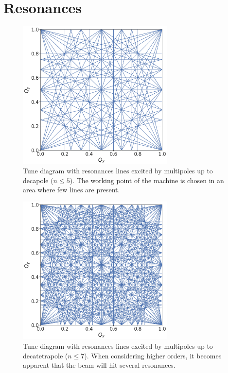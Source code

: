 \section{Resonances}


%

\begin{figure}[H]
    \centering
    \includegraphics[width=0.7\textwidth]{images/resonance_diagaram_n5.png}
    \caption{Tune diagram with resonances lines excited by multipoles up to decapole ($n \leq 5$).
             The working point of the machine is chosen in an area where few lines are present.}
    \label{fig:resonances:diagram_n5}
\end{figure}


\begin{figure}[H]
    \centering
    \includegraphics[width=0.7\textwidth]{images/resonance_diagaram_n7.png}
    \caption{Tune diagram with resonances lines excited by multipoles up to decatetrapole 
             ($n \leq 7$). When considering higher orders, it becomes apparent that the beam will
             hit several resonances.}
    \label{fig:resonances:diagram_n7}
\end{figure}